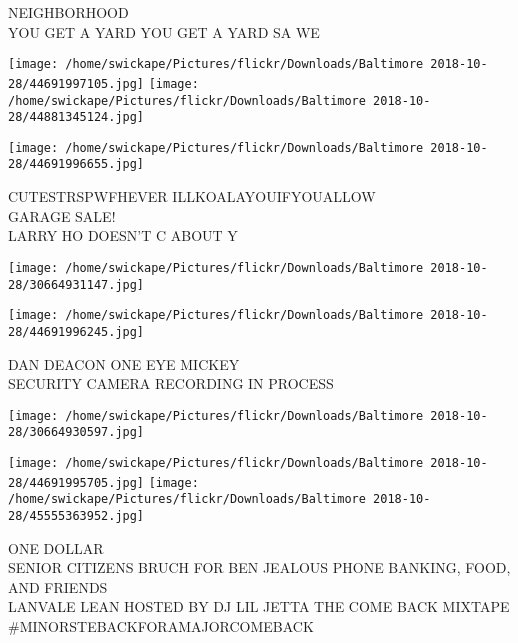\documentclass[10pt,letterpaper]{article}
\begin{document}
NEIGHBORHOOD\\
YOU GET A YARD YOU GET A YARD SA WE\\
\pagebreak

\texttt{[image: /home/swickape/Pictures/flickr/Downloads/Baltimore 2018-10-28/44691997105.jpg]}
\texttt{[image: /home/swickape/Pictures/flickr/Downloads/Baltimore 2018-10-28/44881345124.jpg]}

\texttt{[image: /home/swickape/Pictures/flickr/Downloads/Baltimore 2018-10-28/44691996655.jpg]}

CUTESTRSPWFHEVER ILLKOALAYOUIFYOUALLOW\\
GARAGE SALE!\\
LARRY HO DOESN'T C ABOUT Y\\
\pagebreak

\texttt{[image: /home/swickape/Pictures/flickr/Downloads/Baltimore 2018-10-28/30664931147.jpg]}

\vspace{0.25in}
\texttt{[image: /home/swickape/Pictures/flickr/Downloads/Baltimore 2018-10-28/44691996245.jpg]}

DAN DEACON ONE EYE MICKEY\\
SECURITY CAMERA RECORDING IN PROCESS\\
\pagebreak

\texttt{[image: /home/swickape/Pictures/flickr/Downloads/Baltimore 2018-10-28/30664930597.jpg]}

\vspace{0.25in}
\texttt{[image: /home/swickape/Pictures/flickr/Downloads/Baltimore 2018-10-28/44691995705.jpg]}
\texttt{[image: /home/swickape/Pictures/flickr/Downloads/Baltimore 2018-10-28/45555363952.jpg]}

ONE DOLLAR\\
SENIOR CITIZENS BRUCH FOR BEN JEALOUS PHONE BANKING, FOOD, AND FRIENDS\\
LANVALE LEAN HOSTED BY DJ LIL JETTA THE COME BACK MIXTAPE \#MINORSTEBACKFORAMAJORCOMEBACK\\
\pagebreak
\end{document}
